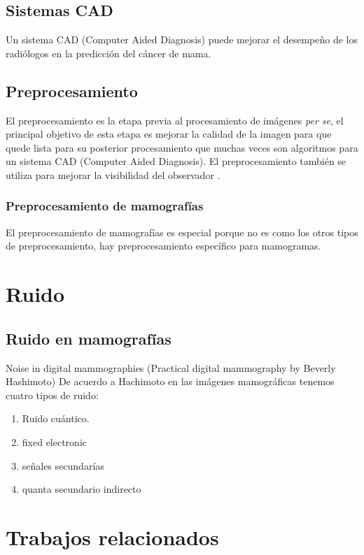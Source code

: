 \subsection{Sistemas CAD}

Un sistema CAD (Computer Aided Diagnosis) puede mejorar el desempeño de los
radiólogos en la predicción del cáncer de mama.

\subsection{Preprocesamiento}
El preprocesamiento es la etapa previa al procesamiento de imágenes \textit{per
se}, el principal objetivo de esta etapa es mejorar la calidad de la imagen
para que quede lista para su posterior procesamiento \cite{ponraj2011survey}
que muchas veces son algoritmos para un sistema CAD (Computer Aided Diagnosis).
El preprocesamiento también se utiliza para mejorar la visibilidad del
observador \cite{rahmati2010new}. 

\subsubsection{Preprocesamiento de mamografías}
El preprocesamiento de mamografías es especial porque no es como los otros tipos
de preprocesamiento, hay preprocesamiento específico para mamogramas.

\section{Ruido}

\subsection{Ruido en mamografías}

\cite{hashimoto2008practical}
Noise in digital mammographies (Practical digital mammography by Beverly
Hashimoto) De acuerdo a Hachimoto en las imágenes mamográficas tenemos cuatro
tipos de ruido:

\begin{enumerate}
    \item Ruido cuántico.
    \item fixed electronic
    \item señales secundarías
    \item quanta secundario indirecto
\end{enumerate}

\section{Trabajos relacionados}

